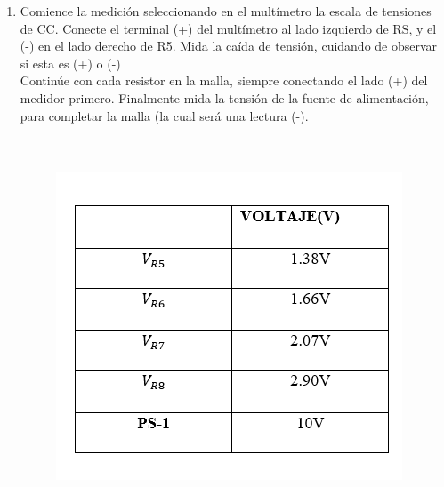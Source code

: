 \begin{enumerate}
	\item Comience la medición seleccionando en el multímetro la escala de tensiones de
	CC. Conecte el terminal (+) del multímetro al lado izquierdo de RS, y el (-) en el
	lado derecho de R5. Mida la caída de tensión, cuidando de observar si esta es (+)
	o (-)
	\\ Continúe con cada resistor en la malla, siempre conectando el lado (+) del
	medidor primero. Finalmente mida la tensión de la fuente de alimentación, para
	completar la malla (la cual será una lectura (-).
	\\
	\\
	\\
	\begin{figure}[h]
		\centering
		\includegraphics[scale=1.2]{imagenes/2.1}
	\end{figure}
	

\end{enumerate}
